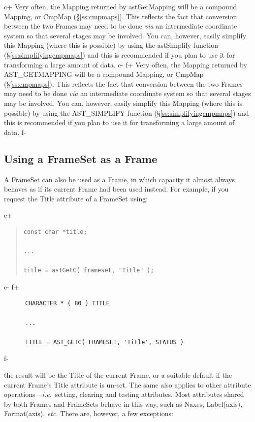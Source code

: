 \documentclass[twoside,11pt]{article}
\newcommand{\secref}[1]{\S\ref{#1}}
\newcommand{\secref}[1]{\ref{#1}}
\begin{document}
c+
Very often, the Mapping returned by astGetMapping will be a compound
Mapping, or CmpMap (\secref{ss:cmpmaps}). This reflects the fact that
conversion between the two Frames may need to be done {\em{via}} an
intermediate coordinate system so that several stages may be involved.
You can, however, easily simplify this Mapping (where this is possible)
by using the astSimplify function (\secref{ss:simplifyingcmpmaps}) and
this is recommended if you plan to use it for transforming a large
amount of data.
c-
f+
Very often, the Mapping returned by AST\_GETMAPPING will be a compound
Mapping, or CmpMap (\secref{ss:cmpmaps}). This reflects the fact that
conversion between the two Frames may need to be done {\em{via}} an
intermediate coordinate system so that several stages may be involved.
You can, however, easily simplify this Mapping (where this is possible)
by using the AST\_SIMPLIFY function (\secref{ss:simplifyingcmpmaps})
and this is recommended if you plan to use it for transforming a large
amount of data.
f-

\subsection{\label{ss:framesetasframe}Using a FrameSet as a Frame}

A FrameSet can also be used as a Frame, in which capacity it almost
always behaves as if its current Frame had been used instead. For
example, if you request the Title attribute of a FrameSet using:

c+
\begin{quote}
\small
\begin{verbatim}
const char *title;

...

title = astGetC( frameset, "Title" );
\end{verbatim}
\normalsize
\end{quote}
c-
f+
\small
\begin{verbatim}
      CHARACTER * ( 80 ) TITLE

      ...

      TITLE = AST_GETC( FRAMESET, 'Title', STATUS )
\end{verbatim}
\normalsize
f-

the result will be the Title of the current Frame, or a suitable
default if the current Frame's Title attribute is un-set. The same
also applies to other attribute operations---{\em{i.e.}}\ setting,
clearing and testing attributes.  Most attributes shared by both
Frames and FrameSets behave in this way, such as Naxes, Label(axis),
Format(axis), {\em{etc.}} There are, however, a few exceptions:
\end{document}
